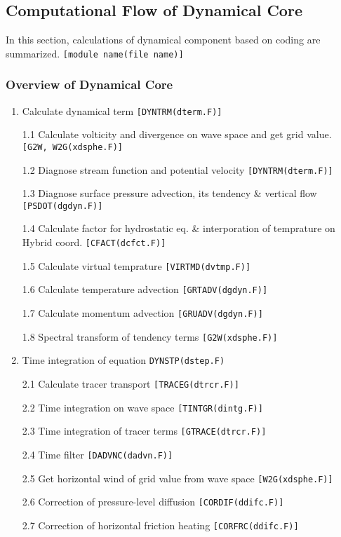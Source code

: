 \hypertarget{computational-flow-of-dynamical-core}{%
\subsection{Computational Flow of Dynamical
Core}\label{computational-flow-of-dynamical-core}}

In this section, calculations of dynamical component based on coding are
summarized. \texttt{{[}module\ name(file\ name){]}}

\hypertarget{overview-of-dynamical-core}{%
\subsubsection{Overview of Dynamical
Core}\label{overview-of-dynamical-core}}

\begin{enumerate}
\def\labelenumi{\arabic{enumi}.}
\item
  Calculate dynamical term \texttt{{[}DYNTRM(dterm.F){]}}

  1.1 Calculate volticity and divergence on wave space and get grid
  value. \texttt{{[}G2W,\ W2G(xdsphe.F){]}}

  1.2 Diagnose stream function and potential velocity
  \texttt{{[}DYNTRM(dterm.F){]}}

  1.3 Diagnose surface pressure advection, its tendency \& vertical flow
  \texttt{{[}PSDOT(dgdyn.F){]}}

  1.4 Calculate factor for hydrostatic eq. \& interporation of
  temprature on Hybrid coord. \texttt{{[}CFACT(dcfct.F){]}}

  1.5 Calculate virtual temprature \texttt{{[}VIRTMD(dvtmp.F){]}}

  1.6 Calculate temperature advection \texttt{{[}GRTADV(dgdyn.F){]}}

  1.7 Calculate momentum advection \texttt{{[}GRUADV(dgdyn.F){]}}

  1.8 Spectral transform of tendency terms \texttt{{[}G2W(xdsphe.F){]}}
\item
  Time integration of equation \texttt{DYNSTP(dstep.F)}

  2.1 Calculate tracer transport \texttt{{[}TRACEG(dtrcr.F){]}}

  2.2 Time integration on wave space \texttt{{[}TINTGR(dintg.F){]}}

  2.3 Time integration of tracer terms \texttt{{[}GTRACE(dtrcr.F){]}}

  2.4 Time filter \texttt{{[}DADVNC(dadvn.F){]}}

  2.5 Get horizontal wind of grid value from wave space
  \texttt{{[}W2G(xdsphe.F){]}}

  2.6 Correction of pressure-level diffusion
  \texttt{{[}CORDIF(ddifc.F){]}}

  2.7 Correction of horizontal friction heating
  \texttt{{[}CORFRC(ddifc.F){]}}
\end{enumerate}
